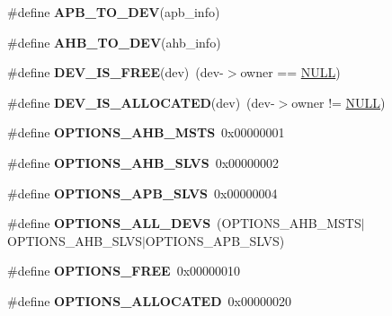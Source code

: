 \begin{DoxyCompactItemize}
\item 
\#define {\bfseries A\+P\+B\+\_\+\+T\+O\+\_\+\+D\+EV}(apb\+\_\+info)
\item 
\#define {\bfseries A\+H\+B\+\_\+\+T\+O\+\_\+\+D\+EV}(ahb\+\_\+info)
\item 
\mbox{\label{group__amba_ga61908f0a833480f301211cbdc9f3ad19}} 
\#define {\bfseries D\+E\+V\+\_\+\+I\+S\+\_\+\+F\+R\+EE}(dev)~(dev-\/$>$owner == \mbox{\hyperlink{bestcomm__api_8h_a872bb74de61c3689ccd5b41873fce42c}{N\+U\+LL}})
\item 
\mbox{\label{group__amba_gafe5623fe8b1ec2c9620e0005dc553da2}} 
\#define {\bfseries D\+E\+V\+\_\+\+I\+S\+\_\+\+A\+L\+L\+O\+C\+A\+T\+ED}(dev)~(dev-\/$>$owner != \mbox{\hyperlink{bestcomm__api_8h_a872bb74de61c3689ccd5b41873fce42c}{N\+U\+LL}})
\item 
\mbox{\label{group__amba_ga55961827f429010f72d8368614dddcb3}} 
\#define {\bfseries O\+P\+T\+I\+O\+N\+S\+\_\+\+A\+H\+B\+\_\+\+M\+S\+TS}~0x00000001
\item 
\mbox{\label{group__amba_ga54ca71c62114db4ca2463d01cba69a61}} 
\#define {\bfseries O\+P\+T\+I\+O\+N\+S\+\_\+\+A\+H\+B\+\_\+\+S\+L\+VS}~0x00000002
\item 
\mbox{\label{group__amba_ga48d39db6b1da202e59ccc5844d4b1170}} 
\#define {\bfseries O\+P\+T\+I\+O\+N\+S\+\_\+\+A\+P\+B\+\_\+\+S\+L\+VS}~0x00000004
\item 
\mbox{\label{group__amba_ga5c28e66af634b54e84b6a031b03f4ba7}} 
\#define {\bfseries O\+P\+T\+I\+O\+N\+S\+\_\+\+A\+L\+L\+\_\+\+D\+E\+VS}~(O\+P\+T\+I\+O\+N\+S\+\_\+\+A\+H\+B\+\_\+\+M\+S\+TS$\vert$O\+P\+T\+I\+O\+N\+S\+\_\+\+A\+H\+B\+\_\+\+S\+L\+VS$\vert$O\+P\+T\+I\+O\+N\+S\+\_\+\+A\+P\+B\+\_\+\+S\+L\+VS)
\item 
\mbox{\label{group__amba_gadf4a09f329f9515c1d5b7a5cabba65a3}} 
\#define {\bfseries O\+P\+T\+I\+O\+N\+S\+\_\+\+F\+R\+EE}~0x00000010
\item 
\mbox{\label{group__amba_gae33c7c8d76a52cf475985502acd4a408}} 
\#define {\bfseries O\+P\+T\+I\+O\+N\+S\+\_\+\+A\+L\+L\+O\+C\+A\+T\+ED}~0x00000020
\item 

\end{DoxyCompactItemize}
